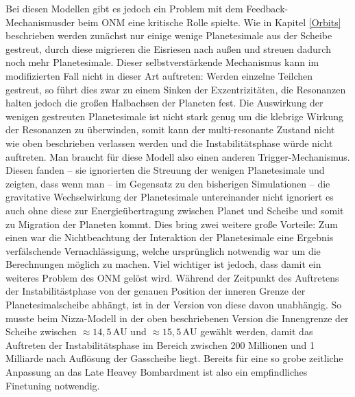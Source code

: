 \documentclass[12pt,a4paper,twoside]{article}
\newcommand{\AU}{\,\mathrm{AU}}
\begin{document}
Bei diesen Modellen gibt es jedoch ein Problem mit dem \glqq Feedback-Mechanismus\grqq der beim ONM eine kritische Rolle spielte. Wie in Kapitel \ref{Orbits} beschrieben werden zunächst nur einige wenige Planetesimale  aus der Scheibe gestreut, durch diese migrieren die Eisriesen nach außen und streuen dadurch noch mehr Planetesimale. Dieser selbstverstärkende Mechanismus kann im modifizierten Fall nicht in dieser Art auftreten: Werden einzelne Teilchen gestreut, so führt dies zwar zu einem Sinken der Exzentrizitäten, die Resonanzen halten jedoch die großen Halbachsen der Planeten fest\cite{Levison2011}.
Die Auswirkung der wenigen gestreuten Planetesimale ist nicht stark genug um die klebrige Wirkung der Resonanzen zu überwinden, somit kann der multi-resonante Zustand nicht wie oben beschrieben verlassen werden und die Instabilitätsphase würde nicht auftreten.
Man braucht für diese Modell also einen anderen Trigger-Mechanismus. Diesen fanden \cite{Levison2011} -- sie ignorierten die Streuung der wenigen Planetesimale und zeigten, dass wenn man -- im Gegensatz zu den bisherigen Simulationen -- die gravitative Wechselwirkung der Planetesimale untereinander nicht ignoriert es auch ohne diese zur Energieübertragung zwischen Planet und Scheibe und somit zu Migration der Planeten kommt.
Dies bring zwei weitere große Vorteile:
Zum einen war die Nichtbeachtung der Interaktion der Planetesimale eine Ergebnis verfälschende Vernachlässigung, welche ursprünglich notwendig war um die Berechnungen möglich zu machen. %
Viel wichtiger ist jedoch, dass damit ein weiteres Problem des ONM gelöst wird. Während der Zeitpunkt des Auftretens der Instabilitästphase von der genauen Position der inneren Grenze der Planetesimalscheibe abhängt, ist in der Version von \cite{Morbidelli2007b, Levison2011} diese davon unabhängig.
So musste beim Nizza-Modell in der oben beschriebenen Version die Innengrenze der Scheibe zwischen $\approx14,5 \AU$ und $\approx15,5 \AU$ gewählt werden, damit das Auftreten der Instabilitätsphase im Bereich zwischen 200 Millionen und 1 Milliarde nach Auflösung der Gasscheibe liegt\cite{Gomes2005, Levison2011}.
Bereits für eine so grobe zeitliche Anpassung an das Late Heavey Bombardment ist also ein empfindliches Finetuning notwendig.
\end{document}
